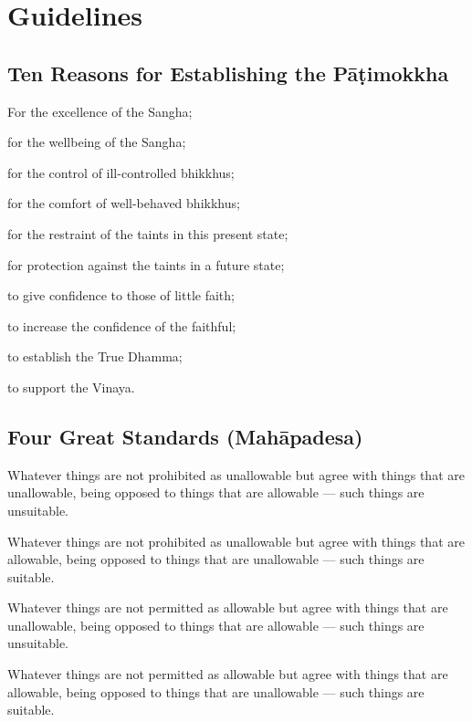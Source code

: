 \chapter{Guidelines}

\section[Establishing of the Pāṭimokkha]{Ten Reasons for Establishing the Pāṭimokkha}

\begin{packedenumerate}

\item For the excellence of the Sangha;
\item for the wellbeing of the Sangha;
\item for the control of ill-controlled bhikkhus;
\item for the comfort of well-behaved bhikkhus;
\item for the restraint of the taints in this present state;
\item for protection against the taints in a future state;
\item to give confidence to those of little faith;
\item to increase the confidence of the faithful;
\item to establish the True Dhamma;
\item to support the Vinaya.

\end{packedenumerate}


\section{Four Great Standards (Mahāpadesa)}

Whatever things are not prohibited as unallowable but agree with things that
are unallowable, being opposed to things that are allowable — such things are
unsuitable.

Whatever things are not prohibited as unallowable but agree with things that
are allowable, being opposed to things that are unallowable — such things are
suitable.

Whatever things are not permitted as allowable but agree with things that are
unallowable, being opposed to things that are allowable — such things are
unsuitable.

Whatever things are not permitted as allowable but agree with things that are
allowable, being opposed to things that are unallowable — such things are
suitable.

